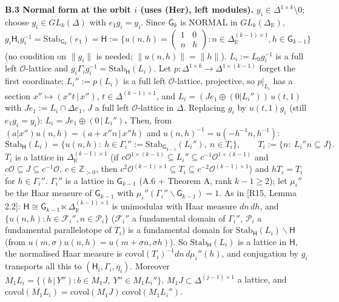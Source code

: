 \textbf{B.3 Normal form at the orbit \(i\) (uses (Her), left modules).} \(y_i\in\Delta^{1\times k}\setminus0\); choose \(g_i\in GL_k(\Delta)\) with \(e_1g_i=y_i\). Since \(\mathsf G_k\) is NORMAL in \(GL_k(\Delta_{\mathbb R})\), \(g_i\mathsf H_ig_i^{-1}=\mathrm{Stab}_{\mathsf G_k}(e_1)=\mathsf H:=\{u(n,h)=\begin{pmatrix}1&0\\n&h\end{pmatrix}:n\in\Delta_{\mathbb R}^{(k-1)\times1},h\in\mathsf G_{k-1}\}\) (no condition on \(\|g_i\|\) is needed; \(\|u(n,h)\|=\|h\|\)). \(L_i:=L_0g_i^{-1}\) is a full left \(\mathcal O\)-lattice and \(g_i\Gamma_ig_i^{-1}=\mathrm{Stab}_{\mathsf H}(L_i)\). Let \(p:\Delta^{1\times k}\to\Delta^{1\times(k-1)}\) forget the first coordinate; \(L_i'':=p(L_i)\) is a full left \(\mathcal O\)-lattice, projective, so \(p|_{L_i}\) has a section \(x''\mapsto(x''t\,|\,x'')\), \(t\in\Delta^{(k-1)\times1}\), and \(L_i=(Je_1\oplus(0|L_i''))\,u(t,1)\) with \(Je_1:=L_i\cap\Delta e_1\), \(J\) a full left \(\mathcal O\)-lattice in \(\Delta\). Replacing \(g_i\) by \(u(t,1)g_i\) (still \(e_1g_i=y_i\)): \textbf{\(L_i=Je_1\oplus(0\,|\,L_i'')\).} Then, from \((a|x'')u(n,h)=(a+x''n\,|\,x''h)\) and \(u(n,h)^{-1}=u(-h^{-1}n,h^{-1})\):
\[\mathrm{Stab}_{\mathsf H}(L_i)=\{u(n,h):\ h\in\Gamma_i'':=\mathrm{Stab}_{\mathsf G_{k-1}}(L_i''),\ n\in T_i\},\qquad T_i:=\{n:\ L_i''n\subseteq J\}.\]
\(T_i\) is a lattice in \(\Delta_{\mathbb R}^{(k-1)\times1}\) (if \(c\mathcal O^{1\times(k-1)}\subseteq L_i''\subseteq c^{-1}\mathcal O^{1\times(k-1)}\) and \(c\mathcal O\subseteq J\subseteq c^{-1}\mathcal O\), \(c\in\mathbb Z_{>0}\), then \(c^2\mathcal O^{(k-1)\times1}\subseteq T_i\subseteq c^{-2}\mathcal O^{(k-1)\times1}\)) and \(hT_i=T_i\) for \(h\in\Gamma_i''\). \(\Gamma_i''\) is a lattice in \(\mathsf G_{k-1}\) (A.6 + Theorem A, rank \(k-1\ge2\)); let \(\mu_i''\) be the Haar measure of \(\mathsf G_{k-1}\) with \(\mu_i''(\Gamma_i''\backslash\mathsf G_{k-1})=1\). As in {[}R15, Lemma 2.2{]}: \(\mathsf H\cong\mathsf G_{k-1}\ltimes\Delta_{\mathbb R}^{(k-1)\times1}\) is unimodular with Haar measure \(dn\,dh\), and \(\{u(n,h):h\in\mathcal F_i'',n\in\mathcal P_i\}\) (\(\mathcal F_i''\) a fundamental domain of \(\Gamma_i''\), \(\mathcal P_i\) a fundamental parallelotope of \(T_i\)) is a fundamental domain for \(\mathrm{Stab}_{\mathsf H}(L_i)\backslash\mathsf H\) (from \(u(m,\sigma)u(n,h)=u(m+\sigma n,\sigma h)\)). So \(\mathrm{Stab}_{\mathsf H}(L_i)\) is a lattice in \(\mathsf H\), the normalised Haar measure is \(\mathrm{covol}(T_i)^{-1}dn\,d\mu_i''(h)\), and conjugation by \(g_i\) transports all this to \((\mathsf H_i,\Gamma_i,\eta_i)\).
Moreover \(M_1L_i=\{(b\,|\,Y''):b\in M_1J,\ Y''\in M_1L_i''\}\), \(M_1J\subset\Delta^{(j-1)\times1}\) a lattice, and \(\mathrm{covol}(M_1L_i)=\mathrm{covol}(M_1J)\,\mathrm{covol}(M_1L_i'')\).

